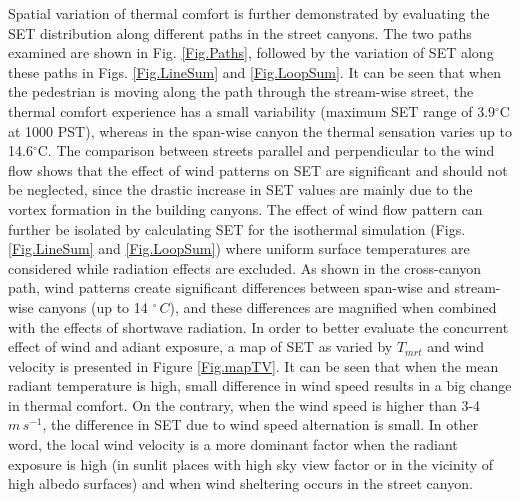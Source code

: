 \documentclass[smallextended]{svjour3}
\newcommand{\degree}{\ensuremath{^\circ}}
\begin{document}
Spatial variation of thermal comfort is further demonstrated by evaluating the SET distribution along different paths in the street canyons. The two paths examined are shown in Fig. \ref{Fig.Paths}, followed by the variation of SET along these paths in Figs. \ref{Fig.LineSum} and \ref{Fig.LoopSum}. It can be seen that when the pedestrian is moving along the path through the stream-wise street, the thermal comfort experience has a small variability (maximum SET range of 3.9$^{\circ}$C at 1000 PST), whereas in the span-wise canyon the thermal sensation varies up to 14.6$^{\circ}$C. The comparison between streets parallel and perpendicular to the wind flow shows that the effect of wind patterns on SET are significant and should not be neglected, since the drastic increase in SET values are mainly due to the vortex formation in the building canyons.  The effect of wind flow pattern can further be isolated by calculating SET for the isothermal simulation (Figs. \ref{Fig.LineSum} and \ref{Fig.LoopSum}) where uniform surface temperatures are considered while radiation effects are excluded.  As shown in the cross-canyon path, wind patterns create significant differences between span-wise and stream-wise canyons (up to 14 $\degree\,C$), and these differences are magnified when combined with the effects of shortwave radiation. In order to better evaluate the concurrent effect of wind and adiant exposure, a map of SET as varied by $T_{mrt}$ and wind velocity is presented in Figure \ref{Fig.mapTV}. It can be seen that when the mean radiant temperature is high, small difference in wind speed results in a big change in thermal comfort. On the contrary, when the wind speed is higher than 3-4 $m\,s^{-1}$, the difference in SET due to wind speed alternation is small. In other word, the local wind velocity is a more dominant factor when the radiant exposure is high (in sunlit places with high sky view factor or in the vicinity of high albedo surfaces) and when wind sheltering occurs in the street canyon. 
\end{document}

